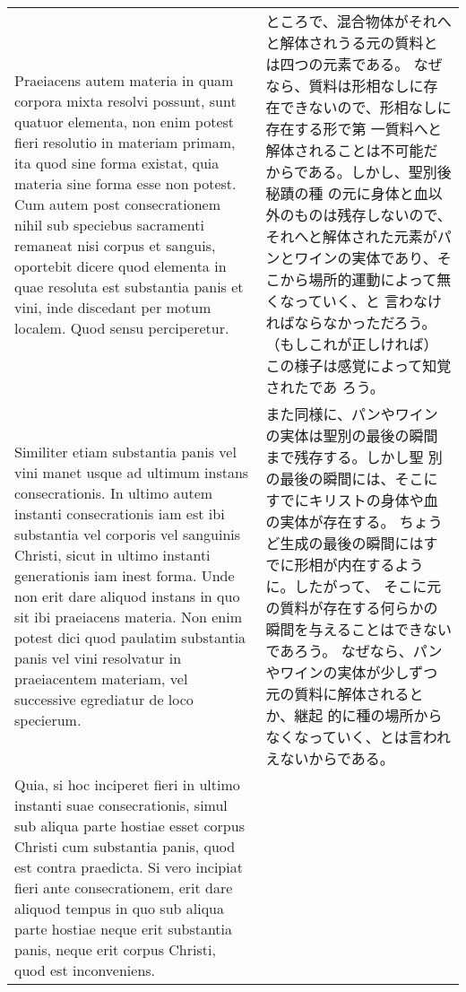 \documentclass[10pt]{jsarticle} %
\begin{document}
\begin{longtable}{p{21em}p{21em}}
\\



Praeiacens autem materia
in quam corpora mixta resolvi possunt, sunt quatuor elementa, non enim
potest fieri resolutio in materiam primam, ita quod sine forma
existat, quia materia sine forma esse non potest. Cum autem post
consecrationem nihil sub speciebus sacramenti remaneat nisi corpus et
sanguis, oportebit dicere quod elementa in quae resoluta est
substantia panis et vini, inde discedant per motum localem. Quod sensu
perciperetur. 



&

ところで、混合物体がそれへと解体されうる元の質料とは四つの元素である。
 なぜなら、質料は形相なしに存在できないので、形相なしに存在する形で第
 一質料へと解体されることは不可能だからである。しかし、聖別後秘蹟の種
 の元に身体と血以外のものは残存しないので、それへと解体された元素がパ
 ンとワインの実体であり、そこから場所的運動によって無くなっていく、と
 言わなければならなかっただろう。（もしこれが正しければ）この様子は感覚によって知覚されたであ
 ろう。


\\


Similiter etiam substantia panis vel vini manet usque ad
ultimum instans consecrationis. In ultimo autem instanti
consecrationis iam est ibi substantia vel corporis vel sanguinis
Christi, sicut in ultimo instanti generationis iam inest forma. Unde
non erit dare aliquod instans in quo sit ibi praeiacens materia. Non
enim potest dici quod paulatim substantia panis vel vini resolvatur in
praeiacentem materiam, vel successive egrediatur de loco
specierum. 


&

また同様に、パンやワインの実体は聖別の最後の瞬間まで残存する。しかし聖
 別の最後の瞬間には、そこにすでにキリストの身体や血の実体が存在する。
 ちょうど生成の最後の瞬間にはすでに形相が内在するように。したがって、
 そこに元の質料が存在する何らかの瞬間を与えることはできないであろう。
 なぜなら、パンやワインの実体が少しずつ元の質料に解体されるとか、継起
 的に種の場所からなくなっていく、とは言われえないからである。



\\

Quia, si hoc inciperet fieri in ultimo instanti suae
consecrationis, simul sub aliqua parte hostiae esset corpus Christi
cum substantia panis, quod est contra praedicta. Si vero incipiat
fieri ante consecrationem, erit dare aliquod tempus in quo sub aliqua
parte hostiae neque erit substantia panis, neque erit corpus Christi,
quod est inconveniens. 




\end{longtable}
\end{document}
